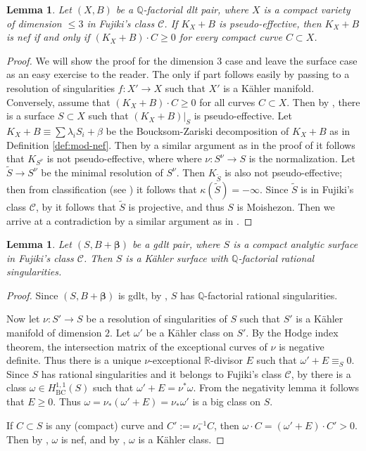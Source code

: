 \documentclass[12pt]{amsart}
\theoremstyle{plain}
\newtheorem{lemma}[theorem]{Lemma}
\theoremstyle{remark}
\theoremstyle{definition}
\def\BC{\operatorname{BC}}
\newcommand{\<}{\leq}
\def\>{\geq}
\newcommand{\mbQ}{\mathbb{Q}}
\newcommand{\mbR}{\mathbb{R}}
\newcommand{\num}{\equiv}
\def\>{\geq}
\def\mcC{\mathcal{C}}
\def\bbeta{\boldsymbol{\beta}}
\theoremstyle{definition}
\theoremstyle{definition}
\numberwithin{equation}{section}
\theoremstyle{remark}
\begin{document}
\begin{lemma}\label{lem:f-adjoint-nef}
 Let $(X, B)$ be a $\mbQ$-factorial dlt pair, where $X$ is a compact variety of dimension $\<3$ in Fujiki's class $\mcC$. If $K_X+B$ is pseudo-effective, then $K_X+B$ is nef if and only if $(K_X+B)\cdot C\>0$ for every compact curve $C\subset X$.
\end{lemma}

\begin{proof}
We will show the proof for the dimension $3$ case and leave the surface case as an easy exercise to the reader. The only if part follows easily by passing to a resolution of singularities $f:X'\to X$ such that $X'$ is a K\"ahler manifold. Conversely, assume that $(K_X+B)\cdot C\>0$ for all curves $C\subset X$. Then by \cite[Remark 2.36]{DHP22}, there is a surface $S\subset X$ such that $(K_X+B)|_S$ is pseudo-effective. Let $K_X+B\num \sum\lambda_iS_i+\beta$ be the Boucksom-Zariski decomposition of $K_X+B$ as in Definition \ref{def:mod-nef}. Then by a similar argument as in the proof of \cite[Lemma 4.1]{HP16} it follows that $K_{S^\nu}$ is not pseudo-effective, where where $\nu:S^\nu\to S$ is the normalization. Let $\tilde S\to S^\nu$ be the minimal resolution of $S^\nu$. Then $K_{\tilde S}$ is also not pseudo-effective; then from classification (see \cite[Table 10, page 244]{BHPV04}) it follows that $\kappa(\tilde S)=-\infty$. Since $\tilde S$ is in Fujiki's class $\mcC$, by \cite[Theorem 1.3]{Fuj21} it follows that $\tilde S$ is projective, and thus $S$ is Moishezon. Then we arrive at a contradiction by a similar argument as in \cite[Corollary 4.2]{HP16}. 
\end{proof}


\begin{lemma}\label{lem:fujiki-to-kahler-surface}
    Let $(S, B+\bbeta )$ be a gdlt pair, where $S$ is a compact analytic surface in Fujiki's class $\mcC$. Then $S$ is a K\"ahler surface with $\mbQ$-factorial rational singularities. 
\end{lemma}

\begin{proof}
Since $(S, B+\bbeta)$ is gdlt, by \cite[Lemma 2.20]{DHY23}, $S$ has $\mbQ$-factorial rational singularities.

Now let $\nu :S'\to S$ be a resolution of singularities of $S$ such that $S'$ is a K\"ahler manifold of dimension $2$. Let $\omega '$ be a K\"ahler class on $S'$. By the Hodge index theorem, the intersection matrix of the exceptional curves of $\nu$ is negative definite. Thus there is a unique $\nu$-exceptional $\mbR$-divisor $E$ such that $\omega'+E\num_S 0$. Since $S$ has rational singularities and it belongs to Fujiki's class $\mcC$, by \cite[Lemma 3.3]{HP16} there is a class $\omega\in H^{1,1}_{\BC}(S)$ such that $\omega'+E=\nu^*\omega$. From the negativity lemma it follows that $E\>0$. Thus $\omega=\nu_*(\omega'+E)=\nu_*\omega'$ is a big class on $S$. 

If $C\subset S $ is any (compact) curve and $C':=\nu ^{-1}_*C$, then $\omega \cdot C=(\omega '+E)\cdot C'>0$. Then by \cite[Theorem 2.36 and Remark 2.37]{DHP22}, $\omega$ is nef, and by \cite[Theorem 2.30]{DHP22}, $\omega $ is a  K\"ahler class.
\end{proof}
\end{document}
